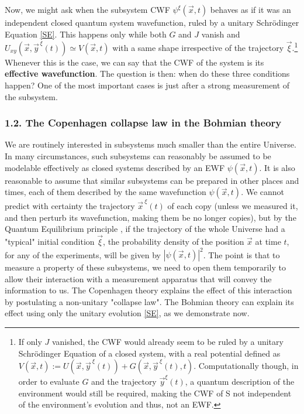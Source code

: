 \documentclass[11pt, a4paper]{article} %
\begin{document}
Now, we might ask when the subsystem CWF $\psi^\xi(\vec{x},t)$ behaves as if it was an independent closed quantum system wavefunction, ruled by a unitary Schrödinger Equation \eqref{SE}. This happens only while both $G$ and $J$ vanish and $U_{xy}(\vec{x},\vec{y}^{\,\xi}(t))\simeq V(\vec{x},t)$ with a same shape irrespective of the trajectory $\vec{\xi}$.\footnote{ If only $J$ vanished, the CWF would already seem to be ruled by a unitary Schrödinger Equation of a closed system, with a real potential defined as $V(\vec{x},t):=U(\vec{x},\vec{y}^{\:\xi}(t))+G(\vec{x},\vec{y}^{\:\xi}(t),t)$. Computationally though, in order to evaluate $G$ and the trajectory $\vec{y}^\xi(t)$, a quantum description of the environment would still be required, making the CWF of S not independent of the environment's evolution and thus, not an EWF. } Whenever this is the case, we can say that the CWF of the system is its {\bf effective wavefunction}. The question is then: when do these three conditions happen? One of the most important cases is just after a strong measurement of the subsystem. 

\vspace{-0.2cm}

\subsubsection*{1.2. The Copenhagen collapse law in the Bohmian theory}
\vspace{-0.1cm}

We are routinely interested in subsystems much smaller than the entire Universe. In many circumstances, such subsystems can reasonably be assumed to be modelable effectively as closed systems described by an EWF $\psi(\vec{x},t)$. It is also reasonable to assume that similar subsystems can be prepared in other places and times, each of them described by the same wavefunction $\psi(\vec{x},t)$. We cannot predict with certainty the trajectory $\vec{x}^{\:\xi}(t)$ of each copy (unless we measured it, and then perturb its wavefunction, making them be no longer copies), but by the Quantum Equilibrium principle \cite{Absolute}, if the trajectory of the whole Universe had a "typical" initial condition $\vec{\xi}$, the probability density of the position $\vec{x}$ at time $t$, for any of the experiments, will be given by $|\psi(\vec{x},t)|^2$. The point is that to measure a property of these subsystems, we need to open them temporarily to allow their interaction with a measurement apparatus that will convey the information to us. The Copenhagen theory explains the effect of this interaction by postulating a non-unitary "collapse law". The Bohmian theory can explain its effect using only the unitary evolution \eqref{SE}, as we demonstrate now.
\end{document}
